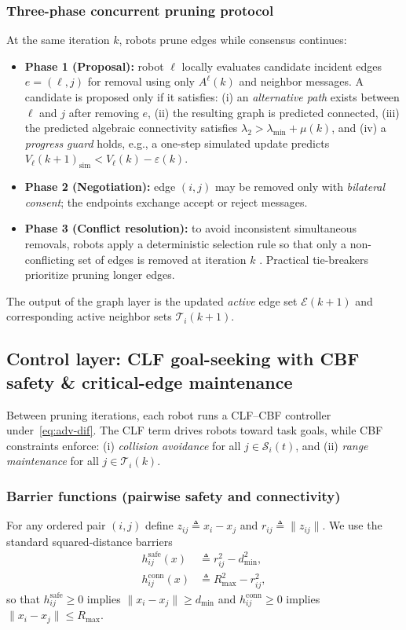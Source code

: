 \documentclass[conference]{IEEEconf}
\theoremstyle{plain}
\begin{document}
\subsubsection{Three-phase concurrent pruning protocol}
At the same iteration $k$, robots prune edges while consensus continues:
\begin{itemize}
\item \textbf{Phase 1 (Proposal):} robot $\ell$ locally evaluates candidate incident edges $e=(\ell,j)$ for removal using only $A^\ell(k)$ and neighbor messages. A candidate is proposed only if it satisfies:
(i) an \emph{alternative path} exists between $\ell$ and $j$ after removing $e$,
(ii) the resulting graph is predicted connected,
(iii) the predicted algebraic connectivity satisfies $\lambda_2 > \lambda_{\min}+\mu(k)$, and
(iv) a \emph{progress guard} holds, e.g., a one-step simulated update predicts
$V_\ell(k{+}1)_{\text{sim}} < V_\ell(k)-\varepsilon(k)$.
\item \textbf{Phase 2 (Negotiation):} edge $(i,j)$ may be removed only with \emph{bilateral consent}; the endpoints exchange accept or reject messages.
\item \textbf{Phase 3 (Conflict resolution):} to avoid inconsistent simultaneous removals, robots apply a deterministic selection rule so that only a non-conflicting set of edges is removed at iteration $k$ . Practical tie-breakers prioritize pruning longer edges.
\end{itemize}

The output of the graph layer is the updated \emph{active} edge set $\mathcal{E}(k{+}1)$ and corresponding active neighbor sets $\mathcal{T}_i(k{+}1)$.

\subsection{Control layer: CLF goal-seeking with CBF safety \& critical-edge maintenance}
Between pruning iterations, each robot runs a CLF--CBF controller under~\eqref{eq:adv-dif}.
The CLF term drives robots toward task goals, while CBF constraints enforce:
(i) \emph{collision avoidance} for all $j\in\mathcal{S}_i(t)$, and
(ii) \emph{range maintenance} for all $j\in\mathcal{T}_i(k)$.

\subsubsection{Barrier functions (pairwise safety and connectivity)}
For any ordered pair $(i,j)$ define $z_{ij}\triangleq x_i-x_j$ and $r_{ij}\triangleq \|z_{ij}\|$.
We use the standard squared-distance barriers
\begin{align}
h^{\mathrm{safe}}_{ij}(x) &\triangleq r_{ij}^2 - d_{\min}^2,
\label{eq:h_safe}\\
h^{\mathrm{conn}}_{ij}(x) &\triangleq R_{\max}^2 - r_{ij}^2,
\label{eq:h_conn}
\end{align}
so that $h^{\mathrm{safe}}_{ij}\ge 0$ implies $\|x_i-x_j\|\ge d_{\min}$ and
$h^{\mathrm{conn}}_{ij}\ge 0$ implies $\|x_i-x_j\|\le R_{\max}$.
\end{document}
